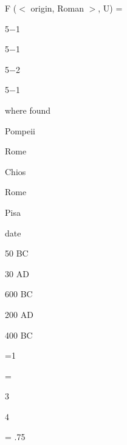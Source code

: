 \documentclass[compress,color=usenames]{beamer}
\begin{document}
\begin{frame}
F ($<$ origin, Roman $>$, U) =

5$-$1


5$-$1


5$-$2


5$-$1










where found



Pompeii



Rome



Chios



Rome



Pisa






date



50 BC



30 AD



600 BC



200 AD



400 BC





=1


=





3


4





= .75










\end{frame}
\end{document}
